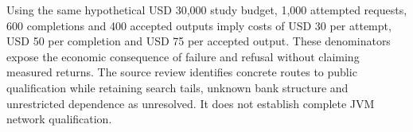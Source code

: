 Using the same hypothetical USD 30,000 study budget, 1,000 attempted requests, 600 completions and 400 accepted outputs imply costs of USD 30 per attempt, USD 50 per completion and USD 75 per accepted output. These denominators expose the economic consequence of failure and refusal without claiming measured returns. The source review identifies concrete routes to public qualification while retaining search tails, unknown bank structure and unrestricted dependence as unresolved. It does not establish complete JVM network qualification.~\citep{exec25_jnet_choice}
